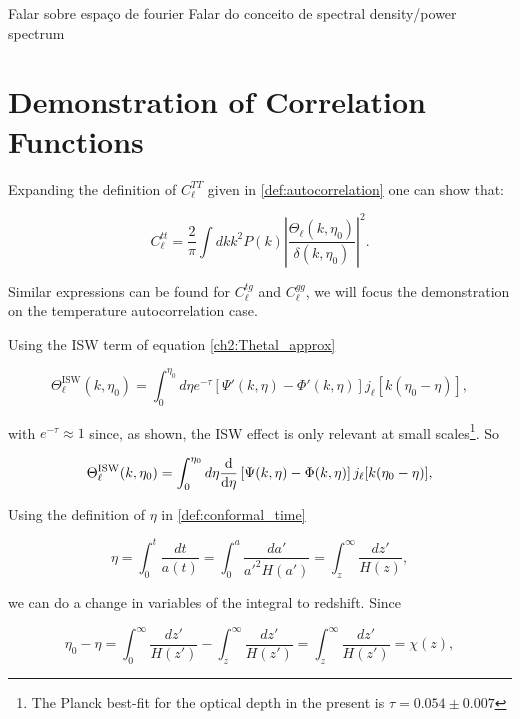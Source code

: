 \documentclass[openany,a4paper,12pt,oneside]{book}
\begin{document}
\begin{spacing}{1.5}
Falar sobre espaço de fourier
Falar do conceito de spectral density/power spectrum
\fi

\chapter{Demonstration of Correlation Functions}\label{App:correlations_demo}

Expanding the definition of $C_\ell^{TT}$ given in \eqref{def:autocorrelation} one can show that\cite{dodelson2020modern}:

\begin{equation}\label{demo:Start_eq}
	C_\ell^{tt}=\frac{2}{\pi}\int dk k^2P(k)\left|\frac{\Theta_\ell(k,\eta_0)}{\delta(k,\eta_0)}\right|^2.
\end{equation}

Similar expressions can be found for $C_\ell^{tg}$ and $C_\ell^{gg}$, we will focus the demonstration on the temperature autocorrelation case.

Using the ISW term of equation \eqref{ch2:Thetal_approx}

\begin{equation}
	\Theta_\ell^{\text{ISW}}(k,\eta_0)=\int_0^{\eta_0} d\eta e^{-\tau}[\Psi'(k,\eta)-\Phi'(k,\eta)]j_\ell[k(\eta_0-\eta)],
\end{equation}

\noindent with $e^{-\tau}\approx 1$ since, as shown, the ISW effect is only relevant at small scales\footnote{The Planck best-fit for the optical depth in the present is $\tau=0.054\pm 0.007$}. So

\begin{equation}\label{appA:step1}
	\Theta_\ell^{\text{ISW}}(k,\eta_0)=\int_0^{\eta_0} d\eta \dv{}{\eta}\left[\Psi(k,\eta)-\Phi(k,\eta)\right]j_\ell[k(\eta_0-\eta)],
\end{equation}

Using the definition of $\eta$ in \eqref{def:conformal_time}

\begin{equation}
	\eta=\int_0^t \frac{dt}{a(t)}=\int_0^a\frac{da'}{a'^2H(a')}=\int_{z}^\infty \frac{dz'}{H(z)},
\end{equation}

\noindent we can do a change in variables of the integral to redshift. Since

\begin{equation}
	\eta_0-\eta=\int_0^\infty \frac{dz'}{H(z')}-\int_z^\infty \frac{dz'}{H(z')}=\int_z^\infty \frac{dz'}{H(z')}=\chi(z),
\end{equation}


\end{spacing}
\end{document}
